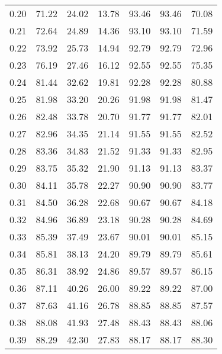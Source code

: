 \begin{tabular}{|c|c|c|c|c|c|c|}
      0.20 &     71.22 &     24.02 &      13.78 &   93.46 &      93.46 &         70.08 \\
      0.21 &     72.64 &     24.89 &      14.36 &   93.10 &      93.10 &         71.59 \\
      0.22 &     73.92 &     25.73 &      14.94 &   92.79 &      92.79 &         72.96 \\
      0.23 &     76.19 &     27.46 &      16.12 &   92.55 &      92.55 &         75.35 \\
      0.24 &     81.44 &     32.62 &      19.81 &   92.28 &      92.28 &         80.88 \\
      0.25 &     81.98 &     33.20 &      20.26 &   91.98 &      91.98 &         81.47 \\
      0.26 &     82.48 &     33.78 &      20.70 &   91.77 &      91.77 &         82.01 \\
      0.27 &     82.96 &     34.35 &      21.14 &   91.55 &      91.55 &         82.52 \\
      0.28 &     83.36 &     34.83 &      21.52 &   91.33 &      91.33 &         82.95 \\
      0.29 &     83.75 &     35.32 &      21.90 &   91.13 &      91.13 &         83.37 \\
      0.30 &     84.11 &     35.78 &      22.27 &   90.90 &      90.90 &         83.77 \\
      0.31 &     84.50 &     36.28 &      22.68 &   90.67 &      90.67 &         84.18 \\
      0.32 &     84.96 &     36.89 &      23.18 &   90.28 &      90.28 &         84.69 \\
      0.33 &     85.39 &     37.49 &      23.67 &   90.01 &      90.01 &         85.15 \\
      0.34 &     85.81 &     38.13 &      24.20 &   89.79 &      89.79 &         85.61 \\
      0.35 &     86.31 &     38.92 &      24.86 &   89.57 &      89.57 &         86.15 \\
      0.36 &     87.11 &     40.26 &      26.00 &   89.22 &      89.22 &         87.00 \\
      0.37 &     87.63 &     41.16 &      26.78 &   88.85 &      88.85 &         87.57 \\
      0.38 &     88.08 &     41.93 &      27.48 &   88.43 &      88.43 &         88.06 \\
      0.39 &     88.29 &     42.30 &      27.83 &   88.17 &      88.17 &         88.30 \\

\end{tabular}
